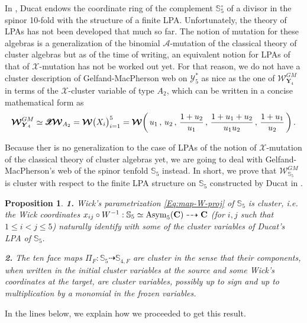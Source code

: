 \documentclass[11pt]{amsart}
\newcommand{\sk}{\smallskip}
\newcommand{\mk}{\medskip}
\newtheorem{prop}[thm]{Proposition}
\begin{document}
In \cite{Ducat}, Ducat endows the coordinate ring of the complement $\mathbb S_5^\circ$ of a divisor in the spinor 10-fold with the structure of a finite LPA. 
Unfortunately, the theory of LPAs has not been developed that much so far. The notion of mutation for these algebras is a generalization of the binomial $\mathscr A$-mutation of the classical theory of cluster algebras but as of the time of writing, an equivalent notion for LPAs of that of $\mathscr X$-mutation has not be worked out yet. For that reason, we do not have a cluster description of Gelfand-MacPherson web on 
$\boldsymbol{\mathcal Y}_5^*$ as nice as the one of 
$\boldsymbol{\mathcal W}^{GM}_{ \boldsymbol{Y}_4}$ in terms of the $\mathscr X$-cluster variable of type $A_2$, which can be written in a concise mathematical form as 
$$
\boldsymbol{\mathcal W}^{GM}_{ \boldsymbol{Y}_4}\simeq 
\boldsymbol{\mathscr X \hspace{-0.45cm} \mathscr X\hspace{-0.1cm}\mathcal W}_{A_2}=\boldsymbol{\mathcal W}\big( X_i\big)_{i=1}^5
=\boldsymbol{\mathcal W}\bigg(\,u_1
\, , \, u_2
\, , \, \frac{1+u_2}{u_1}
\, , \,
\frac{1+u_1+u_2}{u_1u_2}
\, , \,
\frac{1+u_1}{u_2}
 \,\bigg)\,. 
$$




Because ther is no generalization to the case of LPAs of the notion of $\mathcal X$-mutation of the classical theory of cluster algebras yet, we are going to deal  with Gelfand-MacPherson's  web  of the spinor tenfold $\mathbb S_{5}$
instead. In short, we prove that $\boldsymbol{\mathcal W}^{GM}_{ \boldsymbol{\mathbb S}_5}$ is cluster with respect to the finite LPA structure on $\mathbb S_{5}$ constructed by Ducat in \cite{Ducat}. 

\begin{prop}
\label{Prop:Cluster}
{\bf 1.} Wick's parametrization \eqref{Eq:map-W-proj} of $\mathbb S_{5}$ is cluster, {\it i.e.} the Wick coordinates $x_{ij}\circ W^{-1}:  \mathbb S_5\simeq {\rm Asym}_5(\mathbf C)\dashrightarrow \mathbf C$ (for $i,j$ such that $1\leq i<j\leq 5$) naturally identify with some of the cluster variables of Ducat's LPA of $\mathbb S_{5}$. \sk

\noindent 
{\bf 2.}  The ten face maps $\Pi_F: \mathbb S_5\dashrightarrow  \mathbb S_{4,F}$ are cluster in the sense that their components, when written in the initial cluster variables 
at the source 
 and some Wick's coordinates at the target, are cluster variables, possibly up to sign and up to multiplication by a monomial in the frozen variables.
\end{prop}
In the lines below, we explain how we proceeded to get this result. 
\end{document}
